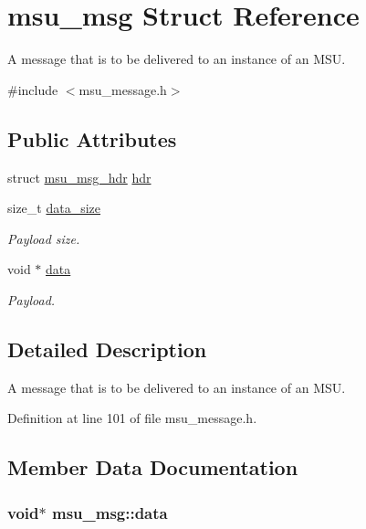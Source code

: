 \hypertarget{structmsu__msg}{\section{msu\-\_\-msg Struct Reference}
\label{structmsu__msg}
}


A message that is to be delivered to an instance of an M\-S\-U.  




{\ttfamily \#include $<$msu\-\_\-message.\-h$>$}

\subsection*{Public Attributes}
\begin{DoxyCompactItemize}
\item 
struct \hyperlink{structmsu__msg__hdr}{msu\-\_\-msg\-\_\-hdr} \hyperlink{structmsu__msg_a3c0177321a542571240821c2350ba424}{hdr}
\item 
size\-\_\-t \hyperlink{structmsu__msg_ad6dbac0bebca6dacb6cc2b1157d114ba}{data\-\_\-size}
\begin{DoxyCompactList}\small\item\em Payload size. \end{DoxyCompactList}\item 
void $\ast$ \hyperlink{structmsu__msg_acf7674882a092f71624a1e70202fb8c2}{data}
\begin{DoxyCompactList}\small\item\em Payload. \end{DoxyCompactList}\end{DoxyCompactItemize}


\subsection{Detailed Description}
A message that is to be delivered to an instance of an M\-S\-U. 

Definition at line 101 of file msu\-\_\-message.\-h.



\subsection{Member Data Documentation}
\hypertarget{structmsu__msg_acf7674882a092f71624a1e70202fb8c2}{
\subsubsection[{data}]{\setlength{\rightskip}{0pt plus 5cm}void$\ast$ msu\-\_\-msg\-::data}}\label{structmsu__msg_acf7674882a092f71624a1e70202fb8c2}


